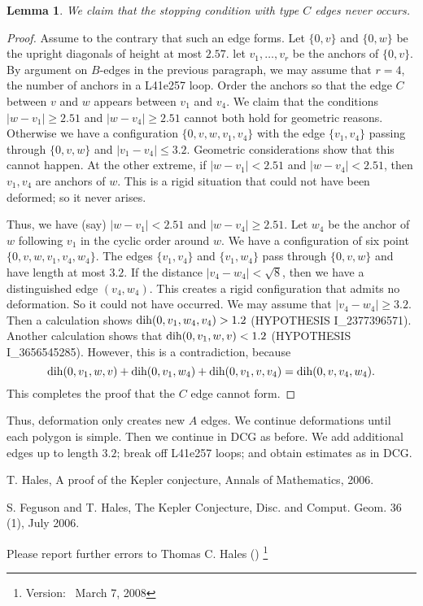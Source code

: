 \documentclass[11pt]{amsart}
\def\ver{~March 7, 2008}
\def\op#1{{\text{#1}}}
\def\text{\hbox}
\newtheorem{lemma}[subsubsection]{Lemma}
\begin{document}
\begin{lemma}
We claim that the stopping condition with type $C$ edges never
occurs.
\end{lemma}

\begin{proof}
Assume to the contrary that such an edge forms.
Let $\{0,v\}$ and $\{0,w\}$ be the upright diagonals of height at most
$2.57$.  let $v_1,\ldots,v_r$ be the anchors of $\{0,v\}$.  By argument on $B$-edges in the previous
paragraph, we may assume that $r=4$, the number of anchors in a L41e257 loop.  Order the anchors so
that the edge $C$ between $v$ and $w$ appears
between $v_1$ and $v_4$.  We claim that the
conditions $|w-v_1|\ge 2.51$ and $|w-v_4|\ge 2.51$ cannot
both hold for geometric reasons.
Otherwise we have a configuration $\{0,v,w,v_1,v_4\}$ with the edge $\{v_1,v_4\}$ passing through $\{0,v,w\}$ and $|v_1-v_4|\le 3.2$.  Geometric considerations show that this cannot happen.  At the other extreme, if $|w-v_1|<2.51$ and $|w-v_4|<2.51$, then $v_1,v_4$ are anchors of $w$.  This is a rigid situation that could not have been deformed; so it never arises.  

Thus, we have (say) $|w-v_1|<2.51$ and $|w-v_4|\ge 2.51$.  Let $w_4$ be the anchor of $w$ following $v_1$ in the cyclic order around $w$.
We have a configuration of six point $\{0,v,w,v_1,v_4,w_4\}$.  The edges $\{v_1,v_4\}$ and $\{v_1,w_4\}$ pass through $\{0,v,w\}$ and have length at most $3.2$.  If the distance $|v_4-w_4|<\sqrt8$, then we have a distinguished edge $(v_4,w_4)$.  This creates a rigid configuration that admits no deformation.  So it could not have occurred.  We may assume that $|v_4-w_4|\ge 3.2$.  Then a calculation shows $\op{dih}(0,v_1,w_4,v_4) > 1.2$ (HYPOTHESIS I\_2377396571).    Another calculation shows that
$\op{dih}(0,v_1,w,v) < 1.2$ (HYPOTHESIS I\_3656545285).  However, this is a contradiction, because
  $$
  \op{dih}(0,v_1,w,v)+\op{dih}(0,v_1,w_4) + \op{dih}(0,v_1,v,v_4) = \op{dih}(0,v,v_4,w_4).
  $$
This completes the proof that the $C$ edge cannot form.
\end{proof}



Thus, deformation only creates new $A$ edges.  We continue deformations until each polygon is simple.  Then we continue in DCG as before.  We add additional edges up to length $3.2$; break off L41e257 loops; and obtain estimates as in DCG.





\begin{thebibliography}{}

 {T. Hales}, A proof of the Kepler
	conjecture, Annals of Mathematics,
	2006.
	
 {S. Feguson and T. Hales},
	The Kepler Conjecture, Disc. and Comput.
	Geom. 36 (1), July 2006.


\end{thebibliography}

Please report further errors to
Thomas C. Hales ()%
\footnote{Version: \ver}
\end{document}
